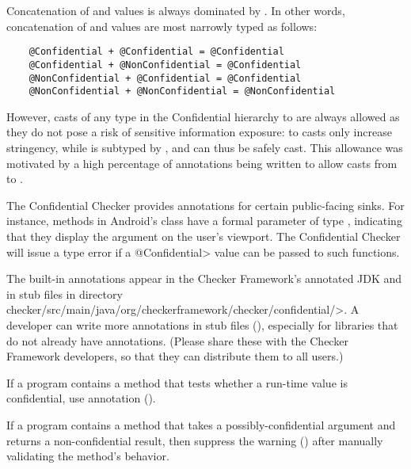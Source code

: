 
Concatenation of  and  values is
always dominated by . In other words, concatenation of
 and  values are most narrowly typed
as follows:

\begin{Verbatim}
    @Confidential + @Confidential = @Confidential
    @Confidential + @NonConfidential = @Confidential
    @NonConfidential + @Confidential = @Confidential
    @NonConfidential + @NonConfidential = @NonConfidential
\end{Verbatim}

However, casts of any type in the Confidential hierarchy to 
are always allowed as they do not pose a risk of sensitive information exposure:
 to  casts only increase stringency,
while  is subtyped by ,
 and can thus be safely cast. This allowance was motivated
by a high percentage of  annotations being written to allow
casts from  to .


The Confidential Checker provides annotations for certain public-facing
sinks.  For instance, methods in Android's  class have a
formal parameter of type , indicating
that they display the argument on the user's viewport.  The Confidential
Checker will issue a type error if a \<@Confidential> value can be passed
to such functions.

The built-in annotations appear in the Checker
Framework's annotated JDK and in stub files in directory
\<checker/src/main/java/org/checkerframework/checker/confidential/>.
A developer can write more annotations in stub files
(), especially for libraries that do not already have
annotations.  (Please share these with the Checker Framework developers, so
that they can distribute them to all users.)

If a program contains a method that tests whether a run-time value is
confidential, use annotation
 ().

If a program contains a method that takes a possibly-confidential argument
and returns a non-confidential result, then suppress the warning
() after manually validating the
method's behavior.
